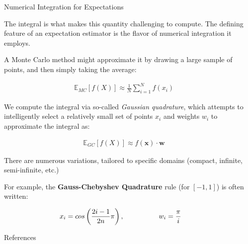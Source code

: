 \documentclass[final]{beamer}
\newlength{\sepwidth}
\newlength{\colwidth}
\newcommand{\separatorcolumn}{\begin{column}{\sepwidth}\end{column}}
\begin{document}
\begin{frame}[fragile]
\begin{columns}[t]
\begin{column}{\colwidth}
\begin{block}{Numerical Integration for Expectations}
  
    The integral is what makes this quantity challenging to compute. The defining feature of an expectation estimator is the flavor of numerical integration it employs. 


    A Monte Carlo method might approximate it by drawing a large sample of points,  and then simply taking the average: 

    \begin{align}
      \mathbb{E}_{MC}[f(X)] \approx \frac{1}{N} \sum_{i = 1}^N f(x_i)
    \end{align}


    We compute the integral via so-called \emph{Gaussian quadrature}, which attempts to intelligently select a relatively small set of points $x_i$ and weights $w_i$ to approximate the integral as: 

    \begin{align}
      \mathbb{E}_{GC}[f(X)] \approx f(\mathbf{x}) \cdot \mathbf{w}
    \end{align}

    There are numerous variations, tailored to specific domains (compact, infinite, semi-infinite, etc.) 
    
    For example, the \textbf{Gauss-Chebyshev Quadrature} rule (for $[-1, 1]$) is often written:

    \begin{align*}
      x_i &= cos \left(\frac{2i - 1}{2n} \pi \right), \hspace{5 em} w_i = \frac{\pi}{i} \notag 
    \end{align*}


  \end{block}

  \begin{block}{References}

    \nocite{*}
    \footnotesize{}

  \end{block}

\end{column}

\separatorcolumn
\end{columns}
\end{frame}
\end{document}
